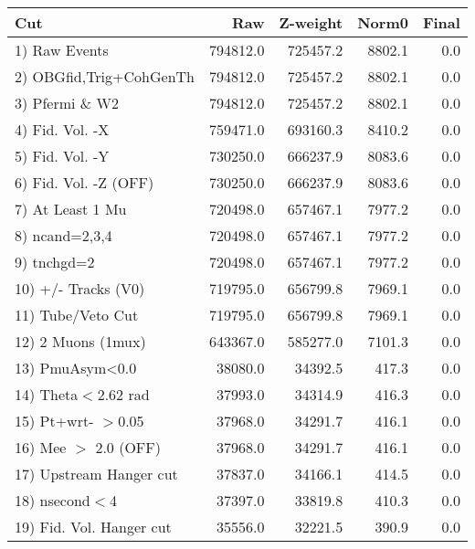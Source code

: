  \begin{table}[h!]\centering
 \begin{tabular}{||l||r|r|r|r||}
 \hline
 \hline
 Cut & Raw & Z-weight & Norm0 & Final \\
 \hline
  1) Raw Events           &    794812.0 &    725457.2 &      8802.1 &         0.0 \\
  2) OBGfid,Trig+CohGenTh &    794812.0 &    725457.2 &      8802.1 &         0.0 \\
  3) Pfermi \& W2         &    794812.0 &    725457.2 &      8802.1 &         0.0 \\
  4) Fid. Vol. -X         &    759471.0 &    693160.3 &      8410.2 &         0.0 \\
  5) Fid. Vol. -Y         &    730250.0 &    666237.9 &      8083.6 &         0.0 \\
  6) Fid. Vol. -Z (OFF)   &    730250.0 &    666237.9 &      8083.6 &         0.0 \\
  7) At Least 1 Mu        &    720498.0 &    657467.1 &      7977.2 &         0.0 \\
  8) ncand=2,3,4          &    720498.0 &    657467.1 &      7977.2 &         0.0 \\
  9) tnchgd=2             &    720498.0 &    657467.1 &      7977.2 &         0.0 \\
 10) +/- Tracks (V0)      &    719795.0 &    656799.8 &      7969.1 &         0.0 \\
 11) Tube/Veto Cut        &    719795.0 &    656799.8 &      7969.1 &         0.0 \\
 12) 2 Muons (1mux)       &    643367.0 &    585277.0 &      7101.3 &         0.0 \\
 13) PmuAsym<0.0          &     38080.0 &     34392.5 &       417.3 &         0.0 \\
 14) Theta$<$2.62 rad     &     37993.0 &     34314.9 &       416.3 &         0.0 \\
 15) Pt+wrt- $>$0.05      &     37968.0 &     34291.7 &       416.1 &         0.0 \\
 16) Mee $>$ 2.0  (OFF)   &     37968.0 &     34291.7 &       416.1 &         0.0 \\
 17) Upstream Hanger cut  &     37837.0 &     34166.1 &       414.5 &         0.0 \\
 18) nsecond$<$4          &     37397.0 &     33819.8 &       410.3 &         0.0 \\
 19) Fid. Vol. Hanger cut &     35556.0 &     32221.5 &       390.9 &         0.0 \\

\end{tabular}
\end{table}
